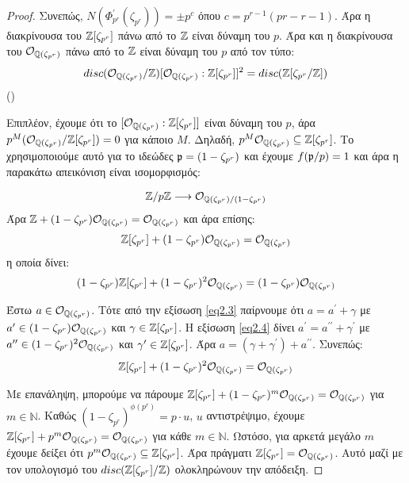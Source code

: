 \documentclass{report}
\begin{document}
\begin{proof}
	Συνεπώς, $N(\Phi^{\prime}_{p^r}(\zeta_{p^r})) =\pm p^c$ όπου $c = p^{r-1}(pr-r-1)$. Άρα η διακρίνουσα του $\mathbb{Z}[\zeta_{p^r}]$ πάνω από το $\mathbb{Z}$ είναι δύναμη του $p$. Άρα και η διακρίνουσα του $\mathcal{O}_{\mathbb{Q}(\zeta_{p^r})}$ πάνω από το $\mathbb{Z}$ είναι δύναμη του $p$ από τον τύπο:
	$$disc(\mathcal{O}_{\mathbb{Q}(\zeta_{p^r})}/\mathbb{Z}) [\mathcal{O}_{\mathbb{Q}(\zeta_{p^r})}: \mathbb{Z}[\zeta_{p^r}]]^2 = disc(\mathbb{Z}[\zeta_{p^r}/\mathbb{Z}])$$
	()

	Επιπλέον, έχουμε ότι το $[\mathcal{O}_{\mathbb{Q}(\zeta_{p^r})}: \mathbb{Z}[\zeta_{p^r}]]$ είναι δύναμη του $p$, άρα $p^M (\mathcal{O}_{\mathbb{Q}(\zeta_{p^r})}/\mathbb{Z}[\zeta_{p^r}]) = 0$ για κάποιο $M$. Δηλαδή, $p^M \mathcal{O}_{\mathbb{Q}(\zeta_{p^r})} \subseteq \mathbb{Z}[\zeta_{p^r}]$. Το χρησιμοποιούμε αυτό για το ιδεώδες $\mathfrak{p} = (1-\zeta_{p^r})$ και έχουμε $f(\mathfrak{p}/p) =1$ και άρα η παρακάτω απεικόνιση είναι ισομορφισμός:

	$$\mathbb{Z} / p\mathbb{Z} \longrightarrow \mathcal{O}_{\mathbb{Q}(\zeta_{p^r})/(1-\zeta_{p^r})}$$
	Άρα $\mathbb{Z} + (1-\zeta_{p^r})\mathcal{O}_{\mathbb{Q}(\zeta_{p^r})} = \mathcal{O}_{\mathbb{Q}(\zeta_{p^r})}$ και άρα επίσης:
	\begin{equation} \label{eq2.3}
		\mathbb{Z}[\zeta_{p^r}] + (1-\zeta_{p^r})\mathcal{O}_{\mathbb{Q}(\zeta_{p^r})} = \mathcal{O}_{\mathbb{Q}(\zeta_{p^r})} 
	\end{equation}
	η οποία δίνει:
	\begin{equation} \label{eq2.4}
		(1-\zeta_{p^r}) \mathbb{Z}[\zeta_{p^r}] + (1-\zeta_{p^r})^2 \mathcal{O}_{\mathbb{Q}(\zeta_{p^r})} = (1-\zeta_{p^r}) \mathcal{O}_{\mathbb{Q}(\zeta_{p^r})}
	\end{equation}

	Έστω $a \in \mathcal{O}_{\mathbb{Q}(\zeta_{p^r})}$. Τότε από την εξίσωση \ref{eq2.3} παίρνουμε ότι $a=a^{\prime} + \gamma$ με $a^{\prime} \in (1-\zeta_{p^r})\mathcal{O}_{\mathbb{Q}(\zeta_{p^r})}$ και $\gamma \in \mathbb{Z}[\zeta_{p^r}]$. Η εξίσωση \ref{eq2.4} δίνει $a^{\prime} = a^{\prime\prime} + \gamma^{\prime}$ με $a^{\prime\prime} \in (1-\zeta_{p^r})^2 \mathcal{O}_{\mathbb{Q}(\zeta_{p^r})}$ και $\gamma^{\prime} \in \mathbb{Z}[\zeta_{p^r}]$. Άρα $a = (\gamma+\gamma^{\prime}) + a^{\prime\prime}$. Συνεπώς:
	$$\mathbb{Z}[\zeta_{p^r}]+ (1-\zeta_{p^r})^2 \mathcal{O}_{\mathbb{Q}(\zeta_{p^r})} = \mathcal{O}_{\mathbb{Q}(\zeta_{p^r})}$$

	Με επανάληψη, μπορούμε να πάρουμε $\mathbb{Z}[\zeta_{p^r}] + (1-\zeta_{p^r})^m \mathcal{O}_{\mathbb{Q}(\zeta_{p^r})} = \mathcal{O}_{\mathbb{Q}(\zeta_{p^r})}$ για $m \in \mathbb{N}$. Καθώς $(1-\zeta_{p^r})^{\phi(p^r)} = p\cdot u$, $u$ αντιστρέψιμο, έχουμε $\mathbb{Z}[\zeta_{p^r}]+ p^m \mathcal{O}_{\mathbb{Q}(\zeta_{p^r})} = \mathcal{O}_{\mathbb{Q}(\zeta_{p^r})}$ για κάθε $m\in\mathbb{N}$. Ωστόσο, για αρκετά μεγάλο $m$ έχουμε δείξει ότι $p^m \mathcal{O}_{\mathbb{Q}(\zeta_{p^r})} \subseteq \mathbb{Z}[\zeta_{p^r}]$. Άρα πράγματι $\mathbb{Z}[\zeta_{p^r}] = \mathcal{O}_{\mathbb{Q}(\zeta_{p^r})}$. Αυτό μαζί με τον υπολογισμό του $disc(\mathbb{Z}[\zeta_{p^r}]/\mathbb{Z})$ ολοκληρώνουν την απόδειξη.  
\end{proof}
\end{document}
